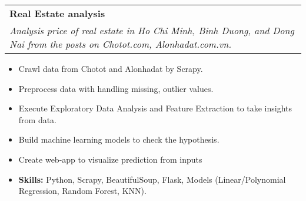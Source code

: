 \documentclass[letterpaper,11pt]{article}
\makeatletter
\newcommand{\resumeItem}[1]{
  \item\small{
    {#1 \vspace{-2pt}}
  }
}
\newcommand{\resumeProjectHeading}[3]{
  \vspace{-2pt}\item
  \begin{tabular*}{0.97\textwidth}{l@{\extracolsep{\fill}}r}
    \small #1 & #2 \\
    \multicolumn{2}{p{0.97\textwidth}}{\textit{\small #3}} %
  \end{tabular*}\vspace{-7pt}
}
\newcommand{\resumeItemListStart}{\begin{itemize}}
\newcommand{\resumeItemListEnd}{\end{itemize}\vspace{-5pt}}
\makeatother
\begin{document}
      \resumeProjectHeading
      {\textbf{Real Estate analysis} }
      {}
      {Analysis price of real estate in Ho Chi Minh, Binh Duong, and Dong Nai from the posts on Chotot.com, Alonhadat.com.vn.}
        \resumeItemListStart
          \resumeItem{Crawl data from Chotot and Alonhadat by Scrapy.}
          \resumeItem{Preprocess data with handling missing, outlier values.}
          \resumeItem{Execute Exploratory Data Analysis and Feature Extraction to take insights from data.}
          \resumeItem{Build machine learning models to check the hypothesis.}
          \resumeItem{Create web-app to visualize prediction from inputs}
          \resumeItem{\textbf{Skills:} Python, Scrapy, BeautifulSoup, Flask, Models (Linear/Polynomial Regression, Random Forest, KNN).}
        \resumeItemListEnd


      
      
      
\end{document}
